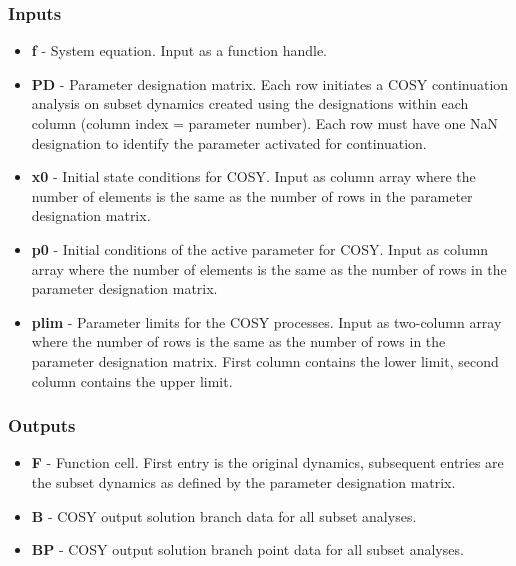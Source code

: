 \documentclass[12pt]{article}
\begin{document}
\subsubsection{Inputs}
\begin{itemize}
\item \textbf{f} - System equation. Input as a function handle.

\item \textbf{PD} - Parameter designation matrix. Each row initiates a COSY continuation analysis on subset dynamics created using the designations within each column (column index = parameter number). Each row must have one NaN designation to identify the parameter activated for continuation.

\item \textbf{x0} - Initial state conditions for COSY. Input as column array where the number of elements is the same as the number of rows in the parameter designation matrix.

\item \textbf{p0} - Initial conditions of the active parameter for COSY. Input as column array where the number of elements is the same as the number of rows in the parameter designation matrix.

\item \textbf{plim} - Parameter limits for the COSY processes. Input as two-column array where the number of rows is the same as the number of rows in the parameter designation matrix. First column contains the lower limit, second column contains the upper limit.

\end{itemize}

\subsubsection{Outputs}

\begin{itemize}
\item \textbf{F} - Function cell. First entry is the original dynamics, subsequent entries are the subset dynamics as defined by the parameter designation matrix.

\item \textbf{B} - COSY output solution branch data for all subset analyses.

\item \textbf{BP} - COSY output solution branch point data for all subset analyses.
\end{itemize}
\end{document}
